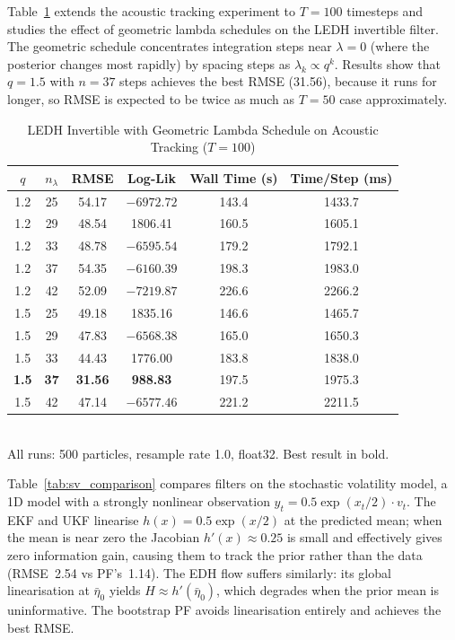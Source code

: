 \documentclass{article}
\begin{document}
Table~\ref{tab:acoustic_tracking_geometric} extends the acoustic tracking experiment to $T=100$ timesteps and studies the effect of geometric lambda schedules on the LEDH invertible filter. The geometric schedule concentrates integration steps near $\lambda=0$ (where the posterior changes most rapidly) by spacing steps as $\lambda_k \propto q^k$. Results show that $q=1.5$ with $n=37$ steps achieves the best RMSE (31.56), because it runs for longer, so RMSE is expected to be twice as much as $T=50$ case approximately.
\begin{table}[H]
\centering
\caption{LEDH Invertible with Geometric Lambda Schedule on Acoustic Tracking ($T=100$)}
\begin{tabular}{cccccc}
\toprule
\textbf{$q$} & \textbf{$n_\lambda$} & \textbf{RMSE} & \textbf{Log-Lik} & \textbf{Wall Time (s)} & \textbf{Time/Step (ms)} \\
\midrule
1.2 & 25 & 54.17 & $-6972.72$ & 143.4 & 1433.7 \\
1.2 & 29 & 48.54 & 1806.41    & 160.5 & 1605.1 \\
1.2 & 33 & 48.78 & $-6595.54$ & 179.2 & 1792.1 \\
1.2 & 37 & 54.35 & $-6160.39$ & 198.3 & 1983.0 \\
1.2 & 42 & 52.09 & $-7219.87$ & 226.6 & 2266.2 \\
\midrule
1.5 & 25 & 49.18 & 1835.16    & 146.6 & 1465.7 \\
1.5 & 29 & 47.83 & $-6568.38$ & 165.0 & 1650.3 \\
1.5 & 33 & 44.43 & 1776.00    & 183.8 & 1838.0 \\
\textbf{1.5} & \textbf{37} & \textbf{31.56} & \textbf{988.83} & 197.5 & 1975.3 \\
1.5 & 42 & 47.14 & $-6577.46$ & 221.2 & 2211.5 \\
\bottomrule
\end{tabular}
\\[0.5em]
{\small All runs: 500 particles, resample rate 1.0, float32. Best result in bold.}
\label{tab:acoustic_tracking_geometric}
\end{table}

Table~\ref{tab:sv_comparison} compares filters on the stochastic volatility model, a 1D model with a strongly nonlinear observation $y_t = 0.5\exp(x_t/2)\cdot v_t$. The EKF and UKF linearise $h(x) = 0.5\exp(x/2)$ at the predicted mean; when the mean is near zero the Jacobian $h'(x) \approx 0.25$ is small and effectively gives zero information gain, causing them to track the prior rather than the data (RMSE~2.54 vs PF's~1.14). The EDH flow suffers similarly: its global linearisation at $\bar\eta_0$ yields $H \approx h'(\bar\eta_0)$, which degrades when the prior mean is uninformative. The bootstrap PF avoids linearisation entirely and achieves the best RMSE. 
\end{document}
